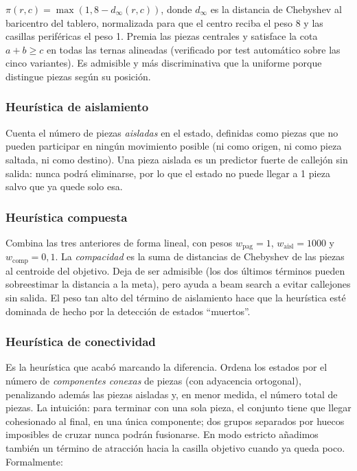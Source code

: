 \documentclass[conference,a4paper]{IEEEtran}
\begin{document}
$\pi(r,c) = \max(1, 8 - d_{\infty}(r,c))$, donde $d_{\infty}$ es la
distancia de Chebyshev al baricentro del tablero, normalizada para que el
centro reciba el peso 8 y las casillas periféricas el peso 1. Premia las
piezas centrales y satisface la cota $a+b\geq c$ en todas las ternas
alineadas (verificado por test automático sobre las cinco variantes). Es
admisible y más discriminativa que la uniforme porque distingue piezas
según su posición.

\subsubsection{Heurística de aislamiento}

Cuenta el número de piezas \emph{aisladas} en el estado, definidas como
piezas que no pueden participar en ningún movimiento posible (ni como
origen, ni como pieza saltada, ni como destino). Una pieza aislada es un
predictor fuerte de callejón sin salida: nunca podrá eliminarse, por lo
que el estado no puede llegar a 1 pieza salvo que ya quede solo esa.

\subsubsection{Heurística compuesta}

Combina las tres anteriores de forma lineal, con pesos
$w_{\text{pag}}=1$, $w_{\text{aisl}}=1000$ y $w_{\text{comp}}=0{,}1$. La
\emph{compacidad} es la suma de distancias de Chebyshev de las piezas al
centroide del objetivo. Deja de ser admisible (los dos últimos términos
pueden sobreestimar la distancia a la meta), pero ayuda a beam search a
evitar callejones sin salida. El peso tan alto del término de
aislamiento hace que la heurística esté dominada de hecho por la
detección de estados ``muertos''.

\subsubsection{Heurística de conectividad}

Es la heurística que acabó marcando la diferencia. Ordena los estados
por el número de \emph{componentes conexas} de piezas (con adyacencia
ortogonal), penalizando además las piezas aisladas y, en menor medida,
el número total de piezas. La intuición: para terminar con una sola
pieza, el conjunto tiene que llegar cohesionado al final, en una única
componente; dos grupos separados por huecos imposibles de cruzar nunca
podrán fusionarse. En modo estricto añadimos también un término de
atracción hacia la casilla objetivo cuando ya queda poco. Formalmente:
\end{document}

